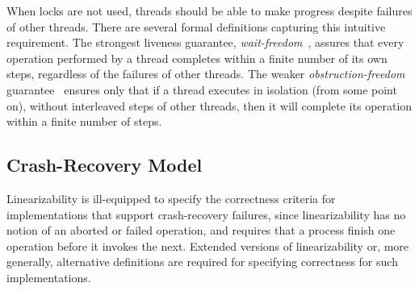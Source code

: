 When locks are not used, threads should be able to make progress despite failures of other threads.
There are several formal definitions capturing this intuitive requirement.
The strongest liveness guarantee, \emph{wait-freedom}~\cite{herlihy91waitfree},
assures that every operation performed by a thread completes within
a finite number of its own steps, regardless of the failures of other threads.
%
The weaker \emph{obstruction-freedom} guarantee~\cite{AttiyaGHK09,HerlihyLMS03, DBLP:conf/icdcs/HerlihyLM03}
ensures only that if a thread executes in isolation (from some point on),
without interleaved steps of other threads,
then it will complete its operation within a finite number of steps.


\subsection{Crash-Recovery Model}
\label{subsec:progressCorrectness}

Linearizability is ill-equipped to specify the correctness criteria for
implementations that support crash-recovery failures,
since linearizability has no notion of an aborted or failed operation,
and requires that a process finish one operation before it invokes the next.
Extended versions of linearizability or, more generally,
alternative definitions are required for
specifying correctness for such implementations.

